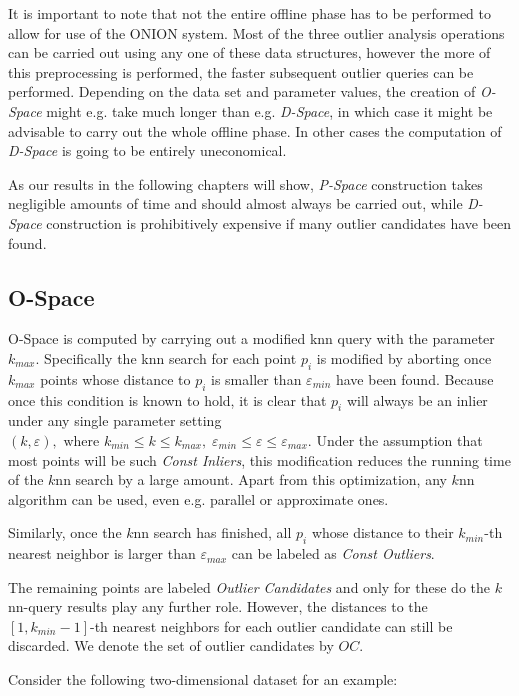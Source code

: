 \documentclass[runningheads]{llncs}
\begin{document}
It is important to note that not the entire offline phase has to be performed to allow for use of the ONION system. Most of the three outlier analysis operations can be carried out using any one of these data structures, however the more of this preprocessing is performed, the faster subsequent outlier queries can be performed. Depending on the data set and parameter values, the creation of \emph{O-Space} might e.g. take much longer than e.g. \emph{D-Space}, in which case it might be advisable to carry out the whole offline phase. In other cases the computation of \emph{D-Space} is going to be entirely uneconomical.

As our results in the following chapters will show, \emph{P-Space} construction takes negligible amounts of time and should almost always be carried out, while \emph{D-Space} construction is prohibitively expensive if many outlier candidates have been found.

\subsection{O-Space}
O-Space is computed by carrying out a modified knn query with the parameter $k_{max}$. Specifically  the knn search for each point $p_i$ is modified by aborting once $k_{max}$ points whose distance to $p_i$ is smaller than $\varepsilon_{min}$ have been found. Because once this condition is known to hold, it is clear that $p_i$ will always be an inlier under any single parameter setting $(k,\varepsilon), \text{ where } k_{min}\leq k \leq k_{max},\; \varepsilon_{min}\leq \varepsilon \leq \varepsilon_{max}$. Under the assumption that most points will be such \emph{Const Inliers}, this modification reduces the running time of the $k$nn search by a large amount. Apart from this optimization, any $k$nn algorithm can be used, even e.g. parallel or approximate ones.

Similarly, once the $k$nn search has finished, all $p_i$ whose distance to their $k_{min}$-th nearest neighbor is larger than $\varepsilon_{max}$ can be labeled as \emph{Const Outliers}.

The remaining points are labeled \emph{Outlier Candidates} and only for these do the $k$nn-query results play any further role.  However, the distances to the $[1,k_{min}-1]$-th nearest neighbors for each outlier candidate can still be discarded. We denote the set of outlier candidates by $OC$.

\newpage

Consider the following two-dimensional dataset for an example:
\end{document}
